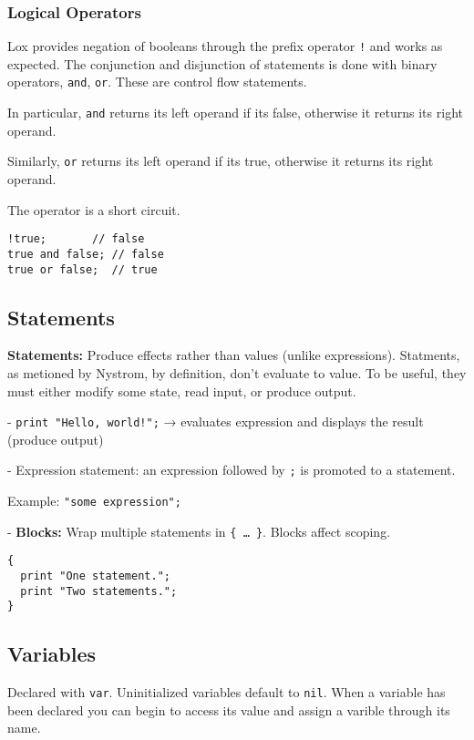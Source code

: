 \documentclass[12pt,a4paper]{article}
\begin{document}
\subsubsection{Logical Operators}
Lox provides negation of booleans through the prefix operator \texttt{!} and works as expected.
The conjunction and disjunction of statements is done with binary operators, \texttt{and}, \texttt{or}.
These are control flow statements.

\noindent In particular, \texttt{and} returns its left operand if its false, otherwise it returns its right operand.

\noindent Similarly, \texttt{or} returns its left operand if its true, otherwise it returns its right operand.

\noindent The operator is a short circuit.
\begin{lstlisting}
!true;       // false
true and false; // false
true or false;  // true
\end{lstlisting}

\subsection{Statements}

\textbf{Statements:} Produce effects rather than values (unlike expressions).
Statments, as metioned by Nystrom, by definition, don't evaluate to value.
To be useful, they must either modify some state, read input, or produce output.

\noindent- \texttt{print "Hello, world!";} → evaluates expression and displays the result (produce output)

\noindent- Expression statement: an expression followed by \texttt{;} is promoted to a statement.

\noindent Example: \texttt{"some expression";}

\noindent - \textbf{Blocks:} Wrap multiple statements in \texttt{\{ … \}}. Blocks affect scoping.
\begin{lstlisting}
{
  print "One statement.";
  print "Two statements.";
}
  \end{lstlisting}

\subsection{Variables}

Declared with \texttt{var}. Uninitialized variables default to \texttt{nil}.
When a variable has been declared you can begin to access its value and assign a varible through its name.
\end{document}

